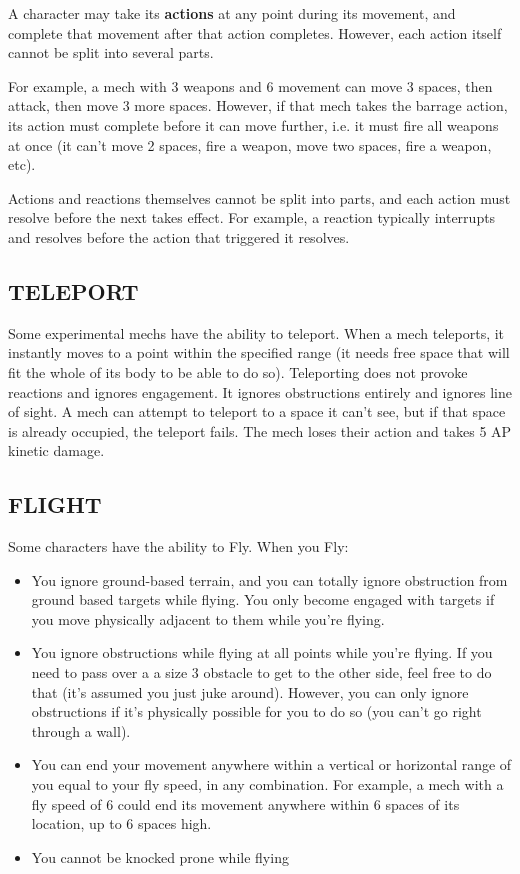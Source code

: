 A character may take its \textbf{actions} at any point during its movement, and complete that movement after that action completes. However, each action itself cannot be split into several parts.

For example, a mech with 3 weapons and 6 movement can move 3 spaces, then attack, then move 3 more spaces. However, if that mech takes the barrage action, its action must complete before it can move further, i.e. it must fire all weapons at once (it can’t move 2 spaces, fire a weapon, move two spaces, fire a weapon, etc).

Actions and reactions themselves cannot be split into parts, and each action must resolve before the next takes effect. For example, a reaction typically interrupts and resolves before the action that triggered it resolves.


\subsection{TELEPORT}

Some experimental mechs have the ability to teleport. When a mech teleports, it instantly moves to a point within the specified range (it needs free space that will fit the whole of its body to be able to do so). Teleporting does not provoke reactions and ignores engagement. It ignores obstructions entirely and ignores line of sight. A mech can attempt to teleport to a space it can’t see, but if that space is already occupied, the teleport fails. The mech loses their action and takes 5 AP kinetic damage.

\subsection{FLIGHT}

Some characters have the ability to Fly. When you Fly:

\begin{itemize}
\item You ignore ground-based terrain, and you can totally ignore obstruction from ground based targets while flying. You only become engaged with targets if you move physically adjacent to them while you’re flying.
\item You ignore obstructions while flying at all points while you’re flying. If you need to pass over a a size 3 obstacle to get to the other side, feel free to do that (it’s assumed you just juke around). However, you can only ignore obstructions if it’s physically possible for you to do so (you can’t go right through a wall).
\item You can end your movement anywhere within a vertical or horizontal range of you equal to your fly speed, in any combination. For example, a mech with a fly speed of 6 could end its movement anywhere within 6 spaces of its location, up to 6 spaces high.
\item You cannot be knocked prone while flying
\end{itemize}

